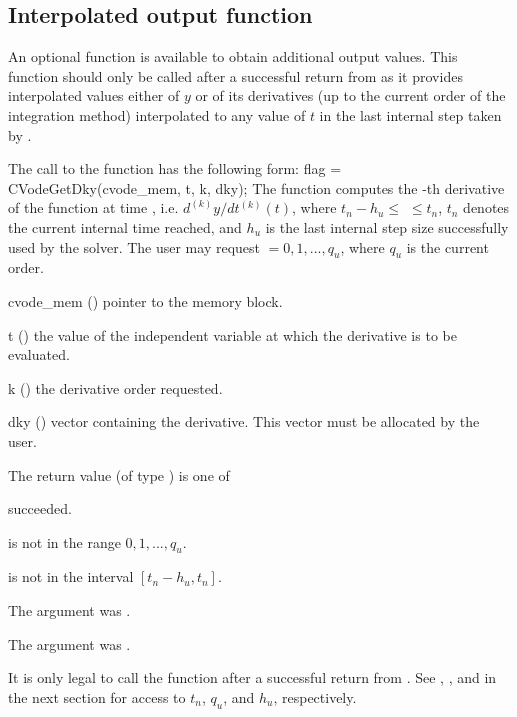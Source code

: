 \subsection{Interpolated output function}\label{ss:optional_dky}

An optional function  is available to obtain additional output values.  
This function should only be called after a successful return from  as it provides 
interpolated values either of $y$ or of its derivatives (up to the current order of the 
integration method) interpolated to any value of $t$ in the last internal step 
taken by {\cvodes}.

The call to the  function has the following form:
{
  flag = CVodeGetDky(cvode\_mem, t, k, dky);
}
{
  The function  computes the -th derivative of the function 
  at time , i.e. $d^{(k)}y/dt^{(k)} (t)$, where $t_n - h_u \le$
   $\le t_n$, $t_n$ denotes the current internal time reached, and $h_u$
  is the  last internal step size successfully used by the solver.  The 
  user may request  $= 0, 1, ..., q_u$, where $q_u$ is the current order. 
}
{
  \begin{args}
  \item[cvode\_mem] ()
    pointer to the {\cvodes} memory block.
  \item[t] ()  the value of the independent variable at
    which the derivative is to be evaluated.
  \item[k] () the derivative order requested.
  \item[dky] ()
    vector containing the derivative.
    This vector must be allocated by the user. 
  \end{args}
}
{
  The return value  (of type ) is one of
  \begin{args} 
  \item[\Id{CV\_SUCCESS}]
     succeeded.
  \item[\Id{CV\_BAD\_K}] 
     is not in the range $0, 1, ..., q_u$.
  \item[\Id{CV\_BAD\_T}] 
     is not in the interval $[t_n - h_u , t_n]$.
  \item[\Id{CV\_BAD\_DKY}] 
    The  argument was .
  \item[\Id{CV\_MEM\_NULL}] 
    The  argument was .
  \end{args}

}
{
  It is only legal to call the function  after a 
  successful return from . See ,
  , and  in the next section for
  access to $t_n$, $q_u$, and $h_u$, respectively.
}

